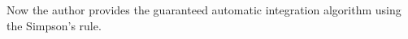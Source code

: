 \documentclass{iitthesis}
\theoremstyle{definition}
\theoremstyle{remark}
\begin{document}
%
%
%
Now the author provides the guaranteed automatic integration algorithm using the Simpson's rule.
\end{document}
